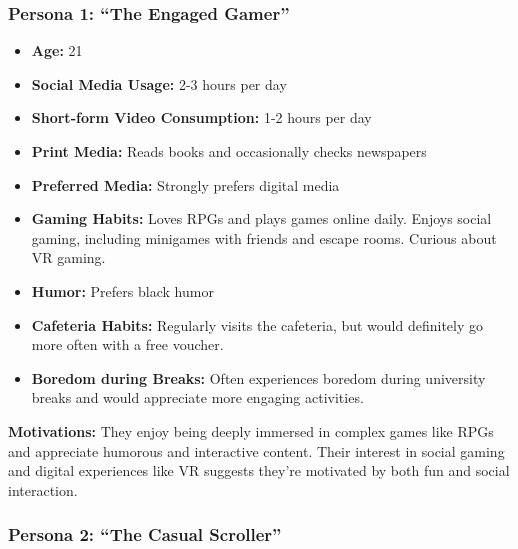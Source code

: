 \documentclass{article}
\begin{document}
\subsubsection{Persona 1: ``The Engaged Gamer''}\label{persona-1-the-engaged-gamer}

\begin{itemize}
\item
  \textbf{Age:} 21
\item
  \textbf{Social Media Usage:} 2-3 hours per day
\item
  \textbf{Short-form Video Consumption:} 1-2 hours per day
\item
  \textbf{Print Media:} Reads books and occasionally checks newspapers
\item
  \textbf{Preferred Media:} Strongly prefers digital media
\item
  \textbf{Gaming Habits:} Loves RPGs and plays games online daily.
  Enjoys social gaming, including minigames with friends and escape
  rooms. Curious about VR gaming.
\item
  \textbf{Humor:} Prefers black humor
\item
  \textbf{Cafeteria Habits:} Regularly visits the cafeteria, but would
  definitely go more often with a free voucher.
\item
  \textbf{Boredom during Breaks:} Often experiences boredom during
  university breaks and would appreciate more engaging activities.
\end{itemize}

\textbf{Motivations:} They enjoy being deeply immersed in complex games
like RPGs and appreciate humorous and interactive content. Their
interest in social gaming and digital experiences like VR suggests
they're motivated by both fun and social interaction.

\subsubsection{Persona 2: ``The Casual Scroller''}\label{persona-2-the-casual-scroller}
\end{document}
